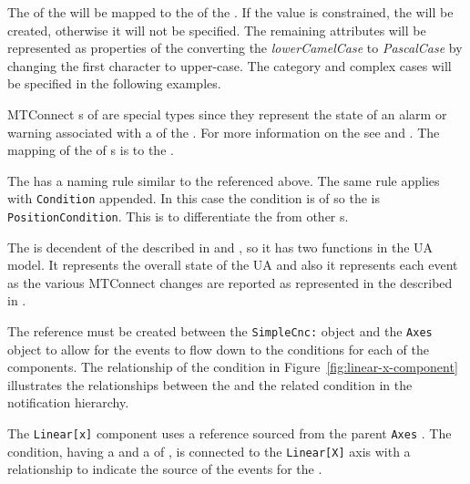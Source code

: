 The  of the  will be mapped to the   of the . If the value is constrained, the  will be created, otherwise it will not be specified. The remaining attributes will be represented as properties of the  converting the \textit{lowerCamelCase} to \textit{PascalCase} by changing the first character to upper-case. The  category and complex cases will be specified in the following examples.

MTConnect s of   are special types since they represent the state of an alarm or warning associated with a  of the . For more information on the  see \cite{MTCPart2} and \cite{MTCPart3}. The mapping of the   of s is to the .

The  has a naming rule similar to the  referenced above. The same rule applies with \texttt{Condition} appended. In this case the condition is of   so the  is \texttt{PositionCondition}. This is to differentiate the  from other s.

The  is decendent of the  described in \cite{UAPart5} and \cite{UAPart9}, so it has two functions in the UA model. It represents the overall state of the UA  and also it represents each event as the various MTConnect  changes are reported as represented in the  described in \cite{MTCPart3}.

The  reference must be created between the \texttt{SimpleCnc:} object and the \texttt{Axes} object to allow for the events to flow down to the conditions for each of the components. The relationship of the condition in Figure~\ref{fig:linear-x-component} illustrates the relationships between the  and the related condition in the notification hierarchy.

The \texttt{Linear[x]} component uses a  reference sourced from the parent \texttt{Axes} . The condition, having a  and a  of , is connected to the \texttt{Linear[X]} axis with a  relationship to indicate the source of the events for the .

